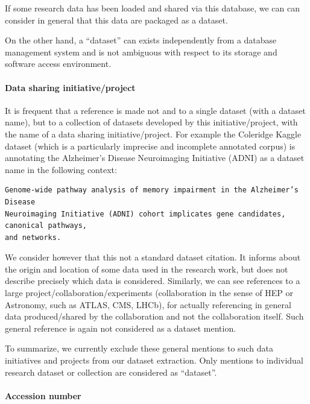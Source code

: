 \documentclass[
]{article}
\begin{document}
If some research data has been loaded and shared via this database, we
can can consider in general that this data are packaged as a dataset.

On the other hand, a ``dataset'' can exists independently from a
database management system and is not ambiguous with respect to its
storage and software access environment.

\hypertarget{data-sharing-initiativeproject}{%
\paragraph{Data sharing
initiative/project}\label{data-sharing-initiativeproject}}

It is frequent that a reference is made not and to a single dataset
(with a dataset name), but to a collection of datasets developed by this
initiative/project, with the name of a data sharing initiative/project.
For example the Coleridge Kaggle dataset (which is a particularly
imprecise and incomplete annotated corpus) is annotating the Alzheimer's
Disease Neuroimaging Initiative (ADNI) as a dataset name in the
following context:

\begin{verbatim}
Genome-wide pathway analysis of memory impairment in the Alzheimer’s Disease 
Neuroimaging Initiative (ADNI) cohort implicates gene candidates, canonical pathways, 
and networks.
\end{verbatim}

We consider however that this not a standard dataset citation. It
informs about the origin and location of some data used in the research
work, but does not describe precisely which data is considered.
Similarly, we can see references to a large
project/collaboration/experiments (collaboration in the sense of HEP or
Astronomy, such as ATLAS, CMS, LHCb), for actually referencing in
general data produced/shared by the collaboration and not the
collaboration itself. Such general reference is again not considered as
a dataset mention.

To summarize, we currently exclude these general mentions to such data
initiatives and projects from our dataset extraction. Only mentions to
individual research dataset or collection are considered as ``dataset''.

\hypertarget{accession-number}{%
\paragraph{Accession number}\label{accession-number}}
\end{document}
